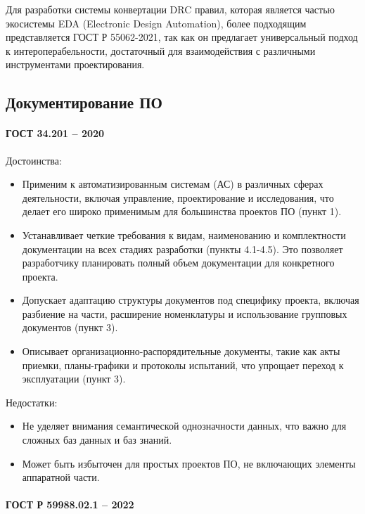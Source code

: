 Для разработки системы конвертации DRC правил,
которая является частью экосистемы EDA (Electronic Design Automation),
более подходящим представляется ГОСТ Р 55062-2021,
так как он предлагает универсальный подход к интероперабельности,
достаточный для взаимодействия с различными инструментами проектирования.

\subsection{Документирование ПО}

\paragraph{ГОСТ 34.201 -- 2020}

Достоинства:

\begin{itemize}
	\item Применим к автоматизированным системам (АС)
		в различных сферах деятельности, включая управление,
		проектирование и исследования,
		что делает его широко применимым для большинства проектов ПО (пункт 1).
	\item Устанавливает четкие требования к видам,
		наименованию и комплектности документации
		на всех стадиях разработки (пункты 4.1-4.5).
		Это позволяет разработчику планировать полный объем документации
		для конкретного проекта.
	\item Допускает адаптацию структуры документов под специфику проекта,
		включая разбиение на части, расширение номенклатуры
		и использование групповых документов (пункт 3).
	\item Описывает организационно-распорядительные документы,
		такие как акты приемки, планы-графики и протоколы испытаний,
		что упрощает переход к эксплуатации (пункт 3).
\end{itemize}

Недостатки:

\begin{itemize}
	\item Не уделяет внимания семантической однозначности данных,
		что важно для сложных баз данных и баз знаний.
	\item Может быть избыточен для простых проектов ПО,
		не включающих элементы аппаратной части.
\end{itemize}

\paragraph{ГОСТ Р 59988.02.1 -- 2022}

